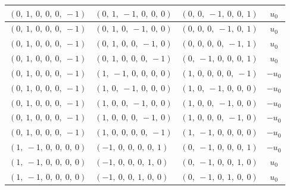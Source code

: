\documentclass[11pt]{article}
\theoremstyle{definition}
\begin{document}
\begin{longtable}{|l|l|l|c|}
    \hline
    $\left( 0, \  1, \  0, \  0, \  0, \  -1\right)$ & $\left( 0, \  1, \  -1, \  0, \  0, \  0\right)$ & $\left( 0, \  0, \  -1, \  0, \  0, \  1\right)$ & $u_{0}$ \\
    \hline
    $\left( 0, \  1, \  0, \  0, \  0, \  -1\right)$ & $\left( 0, \  1, \  0, \  -1, \  0, \  0\right)$ & $\left( 0, \  0, \  0, \  -1, \  0, \  1\right)$ & $u_{0}$ \\
    \hline
    $\left( 0, \  1, \  0, \  0, \  0, \  -1\right)$ & $\left( 0, \  1, \  0, \  0, \  -1, \  0\right)$ & $\left( 0, \  0, \  0, \  0, \  -1, \  1\right)$ & $u_{0}$ \\
    \hline
    $\left( 0, \  1, \  0, \  0, \  0, \  -1\right)$ & $\left( 0, \  1, \  0, \  0, \  0, \  -1\right)$ & $\left( 0, \  -1, \  0, \  0, \  0, \  1\right)$ & $u_{0}$ \\
    \hline
    $\left( 0, \  1, \  0, \  0, \  0, \  -1\right)$ & $\left( 1, \  -1, \  0, \  0, \  0, \  0\right)$ & $\left( 1, \  0, \  0, \  0, \  0, \  -1\right)$ & $- u_{0}$ \\
    \hline
    $\left( 0, \  1, \  0, \  0, \  0, \  -1\right)$ & $\left( 1, \  0, \  -1, \  0, \  0, \  0\right)$ & $\left( 1, \  0, \  -1, \  0, \  0, \  0\right)$ & $- u_{0}$ \\
    \hline
    $\left( 0, \  1, \  0, \  0, \  0, \  -1\right)$ & $\left( 1, \  0, \  0, \  -1, \  0, \  0\right)$ & $\left( 1, \  0, \  0, \  -1, \  0, \  0\right)$ & $- u_{0}$ \\
    \hline
    $\left( 0, \  1, \  0, \  0, \  0, \  -1\right)$ & $\left( 1, \  0, \  0, \  0, \  -1, \  0\right)$ & $\left( 1, \  0, \  0, \  0, \  -1, \  0\right)$ & $- u_{0}$ \\
    \hline
    $\left( 0, \  1, \  0, \  0, \  0, \  -1\right)$ & $\left( 1, \  0, \  0, \  0, \  0, \  -1\right)$ & $\left( 1, \  -1, \  0, \  0, \  0, \  0\right)$ & $- u_{0}$ \\
    \hline
    $\left( 1, \  -1, \  0, \  0, \  0, \  0\right)$ & $\left( -1, \  0, \  0, \  0, \  0, \  1\right)$ & $\left( 0, \  -1, \  0, \  0, \  0, \  1\right)$ & $- u_{0}$ \\
    \hline
    $\left( 1, \  -1, \  0, \  0, \  0, \  0\right)$ & $\left( -1, \  0, \  0, \  0, \  1, \  0\right)$ & $\left( 0, \  -1, \  0, \  0, \  1, \  0\right)$ & $u_{0}$ \\
    \hline
    $\left( 1, \  -1, \  0, \  0, \  0, \  0\right)$ & $\left( -1, \  0, \  0, \  1, \  0, \  0\right)$ & $\left( 0, \  -1, \  0, \  1, \  0, \  0\right)$ & $u_{0}$ \\

\end{longtable}
\end{document}
